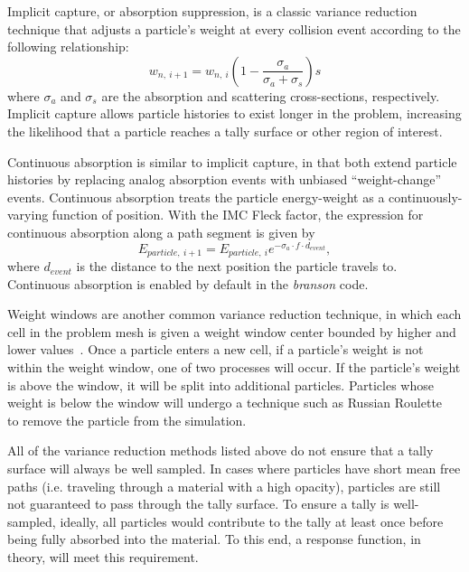 Implicit capture, or absorption suppression, is a classic variance reduction technique that adjusts a particle's weight at every collision event according to the following relationship:
\begin{equation}
w_{n,~i+1} = w_{n,~i}(1 - \frac{\sigma_{a}}{\sigma_{a} + \sigma_{s}})s
\end{equation}
where $\sigma_{a}$ and $\sigma_{s}$ are the absorption and scattering cross-sections, respectively. Implicit capture allows particle histories to exist longer in the problem, increasing the likelihood that a particle reaches a tally surface or other region of interest. 

Continuous absorption is similar to implicit capture, in that both extend particle histories by replacing analog absorption events with unbiased ``weight-change'' events.  Continuous absorption treats the particle energy-weight as a continuously-varying function of position. With the IMC Fleck factor, the expression for continuous absorption along a path segment is given by
\begin{equation} \label{Eq: new_E}
E_{particle,~i+1} = E_{particle,~i}e^{-\sigma_{a} \cdot f \cdot d_{event}},
\end{equation}
where $d_{event}$ is the distance to the next position the particle travels to.  Continuous absorption is enabled by default in the \textit{branson} code.

Weight windows are another common variance reduction technique, in which each cell in the problem mesh is given a weight window center bounded by higher and lower values~\cite{JL16}. Once a particle enters a new cell, if a particle's weight is not within the weight window, one of two processes will occur. If the particle's weight is above the window, it will be split into additional particles. Particles whose weight is below the window will undergo a technique such as Russian Roulette~\cite{LM93} to remove the particle from the simulation.

All of the variance reduction methods listed above do not ensure that a tally surface will always be well sampled. In cases where particles have short mean free paths (i.e. traveling through a material with a high opacity), particles are still not guaranteed to pass through the tally surface. To ensure a tally is  well-sampled, ideally, all particles would contribute to the tally at least once before being fully absorbed into the material. To this end, a response function, in theory, will meet this requirement.

